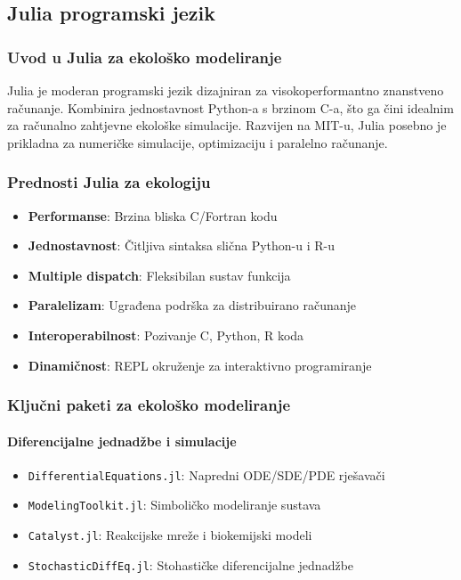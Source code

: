 \documentclass[11pt,oneside]{book}
\begin{document}
\subsection{Julia programski jezik}

\subsubsection{Uvod u Julia za ekološko modeliranje}

Julia je moderan programski jezik dizajniran za visokoperformantno znanstveno računanje. Kombinira jednostavnost Python-a s brzinom C-a, što ga čini idealnim za računalno zahtjevne ekološke simulacije. Razvijen na MIT-u, Julia posebno je prikladna za numeričke simulacije, optimizaciju i paralelno računanje.

\subsubsection{Prednosti Julia za ekologiju}

\begin{itemize}
	\item \textbf{Performanse}: Brzina bliska C/Fortran kodu
	\item \textbf{Jednostavnost}: Čitljiva sintaksa slična Python-u i R-u
	\item \textbf{Multiple dispatch}: Fleksibilan sustav funkcija
	\item \textbf{Paralelizam}: Ugrađena podrška za distribuirano računanje
	\item \textbf{Interoperabilnost}: Pozivanje C, Python, R koda
	\item \textbf{Dinamičnost}: REPL okruženje za interaktivno programiranje
\end{itemize}

\subsubsection{Ključni paketi za ekološko modeliranje}

\paragraph{Diferencijalne jednadžbe i simulacije}

\begin{itemize}
	\item \texttt{DifferentialEquations.jl}: Napredni ODE/SDE/PDE rješavači
	\item \texttt{ModelingToolkit.jl}: Simboličko modeliranje sustava
	\item \texttt{Catalyst.jl}: Reakcijske mreže i biokemijski modeli
	\item \texttt{StochasticDiffEq.jl}: Stohastičke diferencijalne jednadžbe
\end{itemize}
\end{document}
